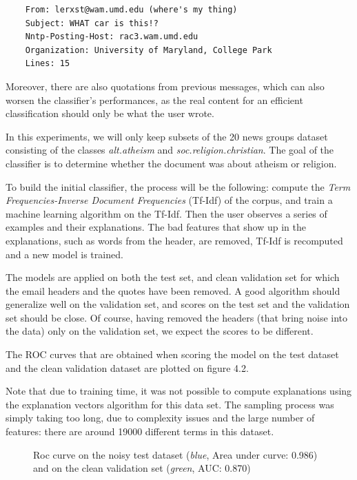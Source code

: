 \documentclass[a4paper,11pt]{kth-mag}
\begin{document}
\footnotesize
\begin{verbatim}
	From: lerxst@wam.umd.edu (where's my thing)
	Subject: WHAT car is this!?
	Nntp-Posting-Host: rac3.wam.umd.edu
	Organization: University of Maryland, College Park
	Lines: 15
\end{verbatim}
\normalsize

Moreover, there are also quotations from previous messages, which can also worsen the classifier's performances, as the real content for an efficient classification should only be what the user wrote.

In this experiments, we will only keep subsets of the 20 news groups dataset consisting of the classes \textit{alt.atheism} and \textit{soc.religion.christian}. The goal of the classifier is to determine whether the document was about atheism or religion.

To build the initial classifier, the process will be the following: compute the \textit{Term Frequencies-Inverse Document Frequencies} (Tf-Idf) of the corpus, and train a machine learning algorithm on the Tf-Idf. Then the user observes a series of examples and their explanations. The bad features that show up in the explanations, such as words from the header, are removed, Tf-Idf is recomputed and a new model is trained.

The models are applied on both the test set, and clean validation set for which the email headers and the quotes have been removed. A good algorithm should generalize well on the validation set, and scores on the test set and the validation set should be close. Of course, having removed the headers (that bring noise into the data) only on the validation set, we expect the scores to be different.

The ROC curves that are obtained when scoring the model on the test dataset and the clean validation dataset are plotted on figure 4.2.

Note that due to training time, it was not possible to compute explanations using the explanation vectors algorithm for this data set. The sampling process was simply taking too long, due to complexity issues and the large number of features: there are around 19000 different terms in this dataset.

\begin{figure}[h!]
		\centering
    	\def\svgwidth{\columnwidth}
    	\resizebox{0.75\textwidth}{!}{}
    	\caption{Roc curve on the noisy test dataset (\textit{blue}, Area under curve: 0.986) and on the clean validation set (\textit{green}, AUC: 0.870)}
\end{figure}
\end{document}
